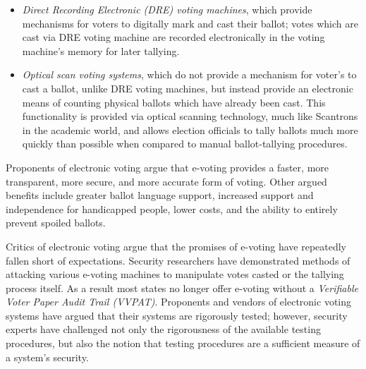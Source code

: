 \begin{itemize}
  \item \emph{Direct Recording Electronic (DRE) voting machines}, which provide
    mechanisms for voters to digitally mark and cast their ballot; votes which
    are cast via DRE voting machine are recorded electronically in the voting
    machine's memory for later tallying.

  \item \emph{Optical scan voting systems}, which do not provide a mechanism for
    voter's to cast a ballot, unlike DRE voting machines, but instead provide an
    electronic means of counting physical ballots which have already been cast.
    This functionality is provided via optical scanning technology, much like
    Scantrons in the academic world, and allows election officials to tally
    ballots much more quickly than possible when compared to manual
    ballot-tallying procedures.
\end{itemize}

Proponents of electronic voting argue that e-voting provides a faster, more
transparent, more secure, and more accurate form of voting. Other argued
benefits include greater ballot language support, increased support and
independence for handicapped people, lower costs, and the ability to entirely
prevent spoiled ballots.

Critics of electronic voting argue that the promises of e-voting have repeatedly
fallen short of expectations. Security researchers have demonstrated methods of
attacking various e-voting machines to manipulate votes casted or the tallying
process itself. As a result most states no longer offer e-voting without a
\emph{Verifiable Voter Paper Audit Trail (VVPAT)}. Proponents and vendors of
electronic voting systems have argued that their systems are rigorously tested;
however, security experts have challenged not only the rigorousness of the
available testing procedures, but also the notion that testing procedures are a
sufficient measure of a system's security.

